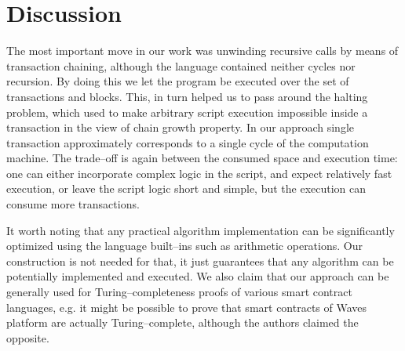 \documentclass[runningheads]{llncs}
\begin{document}
    \section{Discussion}
    \label{section3}
    The most important move in our work was unwinding recursive calls by means
    of transaction chaining, although the language contained neither cycles nor
    recursion. By doing this we let the program be executed over the set of
    transactions and blocks. This, in turn helped us to pass around the halting
    problem, which used to make arbitrary script execution impossible inside a
    transaction in the view of chain growth property. In our approach single
    transaction approximately corresponds to a single cycle of the computation
    machine. The trade--off is again between the consumed space and execution
    time: one can either incorporate complex logic in the script, and expect
    relatively fast execution, or leave the script logic short and simple, but
    the execution can consume more transactions.

    It worth noting that any practical algorithm implementation can be
    significantly optimized using the language built--ins such as arithmetic
    operations. Our construction is not needed for that, it just
    guarantees that any algorithm can be potentially implemented and executed.
    We also claim that our approach can be generally used for Turing--completeness
    proofs of various smart contract languages, e.g. it might be possible to prove
    that smart contracts of Waves platform \cite{wavesSmarts} are actually
    Turing--complete, although the authors claimed the opposite.
\end{document}
